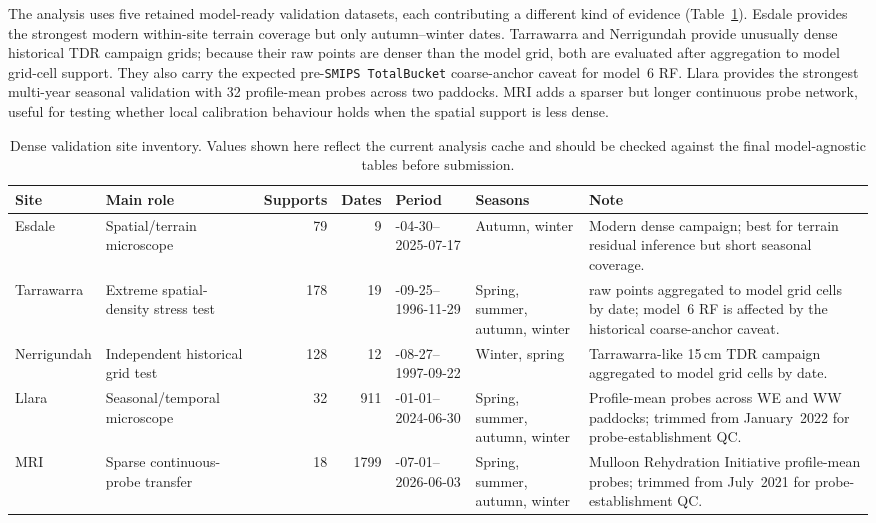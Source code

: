 \documentclass[11pt,a4paper]{article}
\newcommand{\modelSix}{model~6 RF}
\newcommand{\smips}{\texttt{SMIPS TotalBucket}}
\begin{document}
The analysis uses five retained model-ready validation datasets, each
contributing a different kind of evidence (Table~\ref{tab:site-inventory}).
Esdale provides the strongest modern within-site terrain coverage but only
autumn--winter dates.  Tarrawarra and Nerrigundah provide unusually dense
historical TDR campaign grids; because their raw points are denser than the
model grid, both are evaluated after aggregation to model grid-cell support.
They also carry the expected pre-\smips{} coarse-anchor caveat for
\modelSix{}.  Llara provides the strongest multi-year seasonal validation with
32 profile-mean probes across two paddocks.  MRI adds a sparser but longer
continuous probe network, useful for testing whether local calibration
behaviour holds when the spatial support is less dense.

\begin{table}[htbp]
\centering
\caption{Dense validation site inventory.  Values shown here reflect the
current analysis cache and should be checked against the final model-agnostic
tables before submission.}
\label{tab:site-inventory}
\scriptsize
\begin{tabularx}{\textwidth}{@{}>{\raggedright\arraybackslash}p{1.75cm}
                              >{\raggedright\arraybackslash}p{2.20cm}
                              rr
                              >{\raggedright\arraybackslash}p{2.35cm}
                              >{\raggedright\arraybackslash}p{1.8cm}
                              >{\raggedright\arraybackslash}X@{}}
\toprule
Site & Main role & Supports & Dates & Period & Seasons & Note \\
\midrule
Esdale & Spatial/terrain microscope & 79 & 9 & 2025-04-30--2025-07-17
  & Autumn, winter
  & Modern dense campaign; best for terrain residual inference but short
  seasonal coverage. \\
Tarrawarra & Extreme spatial-density stress test & 178 & 19
  & 1995-09-25--1996-11-29
  & Spring, summer, autumn, winter
  & 3610 raw points aggregated to model grid cells by date; \modelSix{} is
  affected by the historical coarse-anchor caveat. \\
Nerrigundah & Independent historical grid test & 128 & 12
  & 1997-08-27--1997-09-22
  & Winter, spring
  & Tarrawarra-like 15\,cm TDR campaign aggregated to model grid cells by date. \\
Llara & Seasonal/temporal microscope & 32 & 911
  & 2022-01-01--2024-06-30
  & Spring, summer, autumn, winter
  & Profile-mean probes across WE and WW paddocks; trimmed from January~2022 for
  probe-establishment QC. \\
MRI & Sparse continuous-probe transfer & 18 & 1799
  & 2021-07-01--2026-06-03
  & Spring, summer, autumn, winter
  & Mulloon Rehydration Initiative profile-mean probes; trimmed from July~2021
  for probe-establishment QC. \\
\bottomrule
\end{tabularx}
\end{table}
\end{document}
